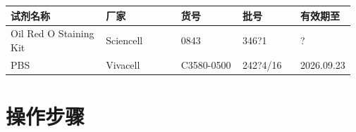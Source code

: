 \documentclass[UTF8,10pt,a4paper,fontset=fandol]{ctexart}
\newcommand{\fieldvalue}[1]{#1}
\newcommand{\handwritten}[1]{#1}
\newcommand{\checkboxfield}[1]{\ifstrequal{#1}{checked}{☑}{\ifstrequal{#1}{unclear}{?}{☐}}}
\begin{document}
\begin{center}
\begin{tabular}{|p{0.28\linewidth}|p{0.22\linewidth}|p{0.18\linewidth}|p{0.17\linewidth}|p{0.12\linewidth}|}
\hline
试剂名称 & 厂家 & 货号 & 批号 & 有效期至\\
\hline
\fieldvalue{Oil Red O Staining Kit} &
\fieldvalue{Sciencell} &
\fieldvalue{0843} &
\fieldvalue{\handwritten{346?1}} &
\fieldvalue{\handwritten{\checkboxfield{unclear}}}\\
\hline
\fieldvalue{PBS} &
\fieldvalue{Vivacell} &
\fieldvalue{C3580-0500} &
\fieldvalue{\handwritten{242?4/16}} &
\fieldvalue{\handwritten{2026.09.23}}\\
\hline
\end{tabular}
\end{center}

\section{操作步骤}
\end{document}
